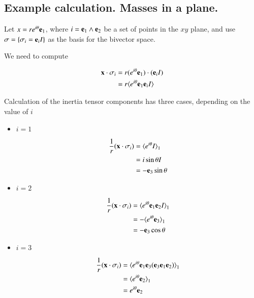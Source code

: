 \documentclass{article}      %
\begin{document}
\subsection{ Example calculation.  Masses in a plane. }

Let $x = re^{i\theta}\mathbf{e}_1$, where $i=\mathbf{e}_1 \wedge \mathbf{e}_2$ be a set of points in the $xy$ plane, and use $\sigma = \{\sigma_i = \mathbf{e}_i I\}$ as the basis for the  bivector space.

We need to compute

\begin{align*}
\mathbf{x} \cdot \sigma_i 
&= r(e^{i\theta} \mathbf{e}_1) \cdot ( \mathbf{e}_i I ) \\
&= r\langle{ e^{i\theta} \mathbf{e}_1 \mathbf{e}_i I }\rangle \\
\end{align*}

Calculation of the inertia tensor components has three cases, depending on the value of $i$

\begin{itemize}
\item $i=1$

\begin{align*}
\frac{1}{r}(\mathbf{x} \cdot \sigma_i) 
&= {\langle e^{i\theta} I\rangle}_1 \\
&= i \sin\theta I \\
&= - \mathbf{e}_3 \sin\theta \\
\end{align*}

\item $i=2$

\begin{align*}
\frac{1}{r}(\mathbf{x} \cdot \sigma_i) 
&= {\langle e^{i\theta} \mathbf{e}_1 \mathbf{e}_2 I\rangle}_1 \\
&= -{\langle e^{i\theta} \mathbf{e}_3 \rangle}_1 \\
&= - \mathbf{e}_3 \cos\theta \\
\end{align*}

\item $i=3$

\begin{align*}
\frac{1}{r}(\mathbf{x} \cdot \sigma_i) 
&= {\langle e^{i\theta} \mathbf{e}_1 \mathbf{e}_3 (\mathbf{e}_3 \mathbf{e}_1 \mathbf{e}_2) \rangle}_1 \\
&= {\langle e^{i\theta} \mathbf{e}_2 \rangle}_1 \\
&= e^{i\theta} \mathbf{e}_2 \\
\end{align*}

\end{itemize}
\end{document}
